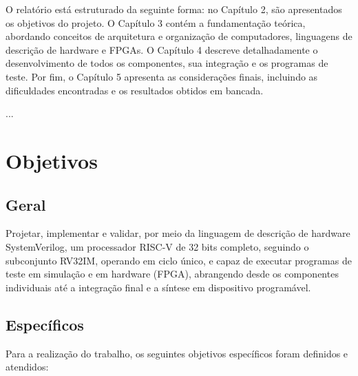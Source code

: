 \documentclass[
	12pt,				%
	oneside,
	a4paper,			%
	english,			%
	french,				%
	spanish,			%
	brazil,				%
	]{abntex2}
\begin{document}
O relatório está estruturado da seguinte forma: no Capítulo 2, são apresentados os objetivos do projeto. O Capítulo 3 contém a fundamentação teórica, abordando conceitos de arquitetura e organização de computadores, linguagens de descrição de hardware e FPGAs. O Capítulo 4 descreve detalhadamente o desenvolvimento de todos os componentes, sua integração e os programas de teste. Por fim, o Capítulo 5 apresenta as considerações finais, incluindo as dificuldades encontradas e os resultados obtidos em bancada.


...

\chapter{Objetivos}

\section{Geral}

Projetar, implementar e validar, por meio da linguagem de descrição de hardware SystemVerilog, um processador RISC-V de 32 bits completo, seguindo o subconjunto RV32IM, operando em ciclo único, e capaz de executar programas de teste em simulação e em hardware (FPGA), abrangendo desde os componentes individuais até a integração final e a síntese em dispositivo programável.

\section{Específicos}

Para a realização do trabalho, os seguintes objetivos específicos foram definidos e atendidos:
\end{document}
